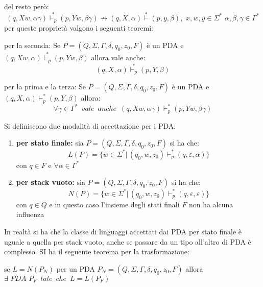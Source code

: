 \documentclass[a4paper,12pt, oneside]{book}
\begin{document}
	del resto però:
	$$(q,Xw,\alpha\gamma) \stackrel{*}{\vdash_p} (p,Yw,\beta\gamma)\not\to (q,X,\alpha) \stackrel{*}{\vdash}(p,y,\beta),\,\,x,w,y\in\Sigma^*\,\,\alpha,\beta,\gamma\in\Gamma^*$$
	per queste proprietà valgono i seguenti teoremi:
	\begin{teorema}
		per la seconda:
		Se $P=(Q,\Sigma,\Gamma,\delta,q_0,z_0,F)$ è un PDA e $(q,Xw,\alpha) \stackrel{*}{\vdash_p} (p,Yw,\beta)$ allora vale anche:
		$$(q,X,\alpha) \stackrel{*}{\vdash_p} (p,Y,\beta)$$
	\end{teorema}
	\begin{teorema}
		per la prima e la terza:
		Se $P=(Q,\Sigma,\Gamma,\delta,q_0,z_0,F)$ è un PDA e $(q,X,\alpha) \vdash_p^* (p,Y,\beta)$ allora:
		$$\forall\gamma\in\Gamma^*\,\,\,vale\,\,\,anche\,\,\,(q,Xw,\alpha\gamma) \vdash_p^* (p,Yw,\beta\gamma)$$
	\end{teorema}
	Si definiscono due modalità di accettazione per i PDA:
	\begin{enumerate}
		\item \textbf{per stato finale:} sia $P=(Q,\Sigma,\Gamma,\delta,q_0,z_0,F)$ si ha che:
		      $$L(P)=\{w\in\Sigma^*|\,(q_0,w,z_0) \vdash_p^* (q,\varepsilon,\alpha)\}$$
		      con $q\in F$ e $\forall \alpha\in \Gamma^*$
		\item \textbf{per stack vuoto:} sia $P=(Q,\Sigma,\Gamma,\delta,q_0,z_0,F)$ si ha che:
		      $$N(P)=\{w\in\Sigma^*|\,(q_0,w,z_0) \vdash_p^* (q,\varepsilon,\varepsilon)\}$$
		      con $q\in Q$ e in questo caso l'insieme degli stati finali $F$ non ha alcuna influenza
	\end{enumerate}
	In realtà si ha che la classe di linguaggi accettati dai PDA per stato finale è uguale a quella per stack vuoto, anche se passare da un tipo all'altro di PDA è complesso. SI ha il seguente teorema per la trasformazione:
	\begin{teorema}
		se $L=N(P_N)$ per un PDA  $P_N=(Q,\Sigma,\Gamma,\delta,q_0,z_0,F)$ allora $\exists \,\,PDA\,\,P_F\,\,\,tale\,\,\,che\,\,\,L=L(P_F)$
	\end{teorema}
\end{document}
